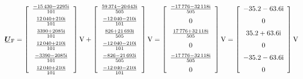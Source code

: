 \begin{exemple}
	\[
	\mcmplx{U}\ped{F} =
	\begin{bmatrix}\begin{array}{c}
			\frac{\complexnum{ -15430 - j 2295}}{101} \\[2mm]
			\frac{\complexnum{12040 + j 210}}{101}  \\[2mm]
			\frac{\complexnum{3390 + j 2085}}{101} \\[2mm]
			\frac{\complexnum{ 12040 + j 210}}{101}  \\[2mm]
			\frac{\complexnum{ -3390 - j 2085}}{101} \\[2mm]
			\frac{\complexnum{ 12040 + j 210}}{101} 
	\end{array}\end{bmatrix}\unit{V} +
	\begin{bmatrix}\begin{array}{c}
		\frac{\complexnum{ 59374 - j 20643}}{505} \\[2mm]
		\frac{\complexnum{-12040 - j 210}}{101}  \\[2mm]
		\frac{\complexnum{826 + j 21693}}{505} \\[2mm]
		\frac{\complexnum{ -12040 - j 210}}{101}  \\[2mm]
		\frac{\complexnum{ -826 - j 21693}}{505} \\[2mm]
		\frac{\complexnum{ -12040 - j 210}}{101}
	\end{array}\end{bmatrix}\unit{V} =
	\begin{bmatrix}\begin{array}{c}
			\frac{\complexnum{ -17776 - j 32118}}{505} \\[2mm]
			0  \\[2mm]
			\frac{\complexnum{17776 + j 32118}}{505} \\[2mm]
			0  \\[2mm]
			\frac{\complexnum{ -17776 - j 32118}}{505} \\[2mm]
			0
	\end{array}\end{bmatrix}\unit{V} =
	\begin{bmatrix}\begin{array}{c}
			\complexnum{-35,2 - j 63,6} \\[2mm]
			0  \\[2mm]
			\complexnum{35,2 + j 63,6} \\[2mm]
			0  \\[2mm]
			\complexnum{-35,2 - j 63,6} \\[2mm]
			0
	\end{array}\end{bmatrix}\unit{V}
	\]
	
\end{exemple}
